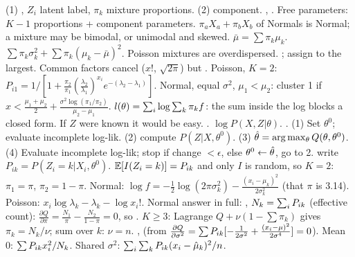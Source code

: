  (1) , $Z_i$ latent label, $\pi_k$ mixture proportions. (2)  component.
\sk{}, . Free parameters: $K-1$ proportions + component parameters.  $\pi_aX_a+\pi_bX_b$ of Normals is Normal; a mixture may be bimodal, or unimodal and skewed.
\sk{} $\bar\mu=\sum\pi_k\mu_k$.  $\sum\pi_k\sigma_k^2+\sum\pi_k(\mu_k-\bar\mu)^2$. Poisson mixtures are overdispersed.
\sk{} ; assign to the largest. Common factors cancel ($x!$, $\sqrt{2\pi}$) but . Poisson, $K=2$: $P_{i1}=1/[1+\frac{\pi_2}{\pi_1}(\frac{\lambda_2}{\lambda_1})^{x_i}e^{-(\lambda_2-\lambda_1)}]$. Normal, equal $\sigma^2$, $\mu_1<\mu_2$: cluster 1 if $x<\frac{\mu_1+\mu_2}2+\frac{\sigma^2\log(\pi_1/\pi_2)}{\mu_2-\mu_1}$.
\bx
{} $l(\theta)=\sum_{i}\log\sum_k\pi_kf$: the sum inside the log blocks a closed form. If $Z$ were known it would be easy.
\sk{} .  $\log P(X,Z|\theta)$.  .
\sk{} (1) Set $\theta^0$; evaluate incomplete log-lik. (2)  compute $P(Z|X,\theta^0)$. (3)  $\hat{\theta}=\arg\max_\theta Q(\theta,\theta^0)$. (4) Evaluate incomplete log-lik; stop if change $<\epsilon$, else $\theta^0\leftarrow\hat{\theta}$, go to 2.
\sk{} write $P_{ik}=P(Z_i=k|X_i,\theta^0)$.
$\mathbb{E}[I(Z_i=k)]=P_{ik}$ and only $I$ is random, so
$K=2$: $\pi_1=\pi$, $\pi_2=1-\pi$. Normal: $\log f=-\frac12\log(2\pi\sigma_k^2)-\frac{(x_i-\mu_k)^2}{2\sigma_k^2}$ (that $\pi$ is 3.14). Poisson: $x_i\log\lambda_k-\lambda_k-\log x_i!$. Normal answer in full:
\sk{}, $N_k=\sum_{i}P_{ik}$ (effective count):
\li\bh{$\pi$:} $\frac{\partial Q}{\partial\pi}=\frac{N_1}\pi-\frac{N_2}{1-\pi}=0$, so . $K\ge3$: Lagrange $Q+\nu(1-\sum\pi_k)$ gives $\pi_k=N_k/\nu$; sum over $k$: $\nu=n$.
\li{} ,  (from $\frac{\partial Q}{\partial\sigma^2}=\sum P_{ik}[-\frac1{2\sigma^2}+\frac{(x_i-\mu)^2}{2\sigma^4}]=0$). Mean 0: $\sum P_{ik} x_i^2/N_k$. Shared $\sigma^2$: $\sum_{i}\sum_{k}P_{ik}(x_i-\hat{\mu}_k)^2/n$.
